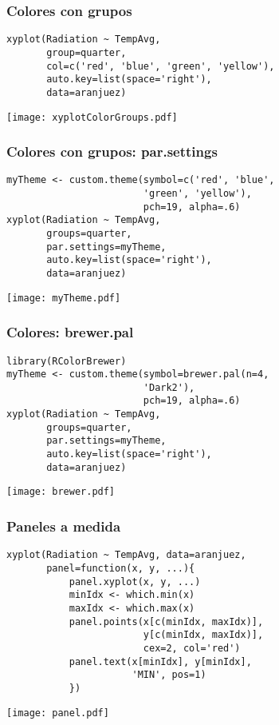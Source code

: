 \documentclass[xcolor={usenames,svgnames,dvipsnames}]{beamer}
\begin{document}
\begin{frame}[fragile]
\frametitle{Colores con grupos}
\label{sec-2-1-11}


\lstset{language=R}
\begin{lstlisting}
xyplot(Radiation ~ TempAvg,
       group=quarter,
       col=c('red', 'blue', 'green', 'yellow'),
       auto.key=list(space='right'),
       data=aranjuez)
\end{lstlisting}

\texttt{[image: xyplotColorGroups.pdf]}
\end{frame}
\begin{frame}[fragile]
\frametitle{Colores con grupos: par.settings}
\label{sec-2-1-12}


\lstset{language=R}
\begin{lstlisting}
myTheme <- custom.theme(symbol=c('red', 'blue',
                        'green', 'yellow'),
                        pch=19, alpha=.6)
xyplot(Radiation ~ TempAvg,
       groups=quarter,
       par.settings=myTheme,
       auto.key=list(space='right'),
       data=aranjuez)
\end{lstlisting}

\texttt{[image: myTheme.pdf]}
\end{frame}
\begin{frame}[fragile]
\frametitle{Colores: brewer.pal}
\label{sec-2-1-13}


\lstset{language=R}
\begin{lstlisting}
library(RColorBrewer)
myTheme <- custom.theme(symbol=brewer.pal(n=4,
                        'Dark2'),
                        pch=19, alpha=.6)
xyplot(Radiation ~ TempAvg,
       groups=quarter,
       par.settings=myTheme,
       auto.key=list(space='right'),
       data=aranjuez)
\end{lstlisting}

\texttt{[image: brewer.pdf]}
\end{frame}
\begin{frame}[fragile]
\frametitle{Paneles a medida}
\label{sec-2-1-14}


\lstset{language=R}
\begin{lstlisting}
xyplot(Radiation ~ TempAvg, data=aranjuez,
       panel=function(x, y, ...){
           panel.xyplot(x, y, ...)
           minIdx <- which.min(x)
           maxIdx <- which.max(x)
           panel.points(x[c(minIdx, maxIdx)],
                        y[c(minIdx, maxIdx)],
                        cex=2, col='red')
           panel.text(x[minIdx], y[minIdx],
                      'MIN', pos=1)
           })
\end{lstlisting}

\texttt{[image: panel.pdf]}
\end{frame}
\end{document}
